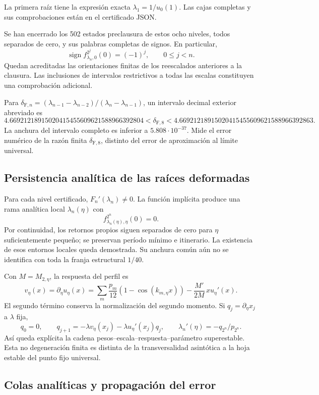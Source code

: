 La primera raíz tiene la expresión exacta \(\lambda_1=1/u_0(1)\). Las cajas completas y sus comprobaciones están en el certificado JSON.

Se han encerrado los 502 estados preclausura de estos ocho niveles, todos separados de cero, y sus palabras completas de signos. En particular,
\[
\operatorname{sign}f_{\lambda_n,0}^{2^j}(0)=(-1)^j,\qquad0\le j<n.
\]
Quedan acreditadas las orientaciones finitas de los reescalados anteriores a la clausura. Las inclusiones de intervalos restrictivos a todas las escalas constituyen una comprobación adicional.

Para \(\delta_{\mathrm F,n}=(\lambda_{n-1}-\lambda_{n-2})/(\lambda_n-\lambda_{n-1})\), un intervalo decimal exterior abreviado es
\[
\boxed{
4.66921218915020415455609621588966392804
<\delta_{\mathrm F,8}<
4.66921218915020415455609621588966392863.
}
\]
La anchura del intervalo completo es inferior a \(5.808\cdot10^{-37}\). Mide el error numérico de la razón finita \(\delta_{\mathrm F,8}\), distinto del error de aproximación al límite universal.


\subsection{Persistencia analítica de las raíces deformadas}
\label{hmtfg:desarrollo:8}

Para cada nivel certificado, \(F_n'(\lambda_n)\ne0\). La función implícita produce una rama analítica local \(\lambda_n(\eta)\) con
\[
f_{\lambda_n(\eta),\eta}^{2^n}(0)=0.
\]
Por continuidad, los retornos propios siguen separados de cero para \(\eta\) suficientemente pequeño; se preservan período mínimo e itinerario. La existencia de esos entornos locales queda demostrada. Su anchura común aún no se identifica con toda la franja estructural \(1/40\).

Con \(M=M_{2,\eta}\), la respuesta del perfil es
\[
v_\eta(x)=\partial_\eta u_\eta(x)
=\sum_m\frac{p_m}{12}(1-\cos(k_{m,\eta}x))
-\frac{M'}{2M}\,x u_\eta'(x).
\]
El segundo término conserva la normalización del segundo momento. Si \(q_j=\partial_\eta x_j\) a \(\lambda\) fija,
\[
q_0=0,\qquad q_{j+1}=-\lambda v_\eta(x_j)-\lambda u_\eta'(x_j)q_j,
\qquad
\boxed{\lambda_n'(\eta)=-q_{2^n}/p_{2^n}}.
\]
Así queda explícita la cadena pesos–escala–respuesta–parámetro superestable. Esta no degeneración finita es distinta de la transversalidad asintótica a la hoja estable del punto fijo universal.


\subsection{Colas analíticas y propagación del error}
\label{hmtfg:desarrollo:9}

